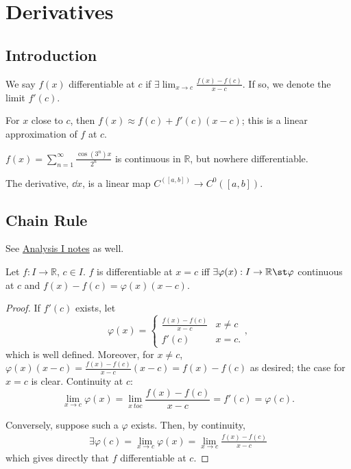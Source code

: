 \section{Derivatives}
\subsection{Introduction}

\begin{definition}[Differentiable]
    We say $f(x)$ differentiable at $c$ if $\exists \lim_{x \to c} \frac{f(x) - f(c)}{x-c}$. If so, we denote the limit $f'(c)$.
\end{definition}

\begin{remark}
    For $x$ close to $c$, then $f(x) \approx f(c) + f'(c)(x-c)$; this is a linear approximation of $f$ at $c$.
\end{remark}

\begin{example}[Weierstrass]
    $f(x) = \sum_{n=1}^\infty \frac{\cos(3^n)x}{2^n}$ is continuous in $\mathbb{R}$, but nowhere differentiable.
\end{example}
\begin{definition}
    The derivative, $\dd{x}$, is a linear map $C^([a, b]) \to C^0([a, b])$.
\end{definition}

\subsection{Chain Rule}
\begin{remark}
    See \href{https://notes.louismeunier.net/Analysis%201/analysis.pdf#page=96}{Analysis I notes} as well.
\end{remark}
\begin{theorem}\label{thm:Caratheodory}
    Let $f: I \to \mathbb{R}$, $c \in I$. $f$ is differentiable at $x = c$ iff $\exists \varphi(x) : I \to \mathbb{R} \st \varphi$ continuous at $c$ and $f(x) - f(c) = \varphi(x)(x - c)$.
\end{theorem}

\begin{proof}
    If $f'(c)$ exists, let \[
    \varphi(x) = \begin{cases}
        \frac{f(x) - f(c)}{x-c} & x \neq c\\
        f'(c) & x = c.
    \end{cases},    
    \]
    which is well defined. Moreover, for $x \neq c$, $\varphi(x)(x - c) = \frac{f(x)-f(c)}{x-c}(x-c) = f(x)-f(c)$ as desired; the case for $x = c$ is clear. Continuity at $c$:
    \[
    \lim_{x \to c} \varphi(x) = \lim_{x \ to c} \frac{f(x) - f(c)}{x - c} = f'(c) = \varphi(c).    
    \]

    Conversely, suppose such a $\varphi$ exists. Then, by continuity, \begin{align*}
        \exists \varphi(c) = \lim_{x \to c} \varphi(x) = \lim_{x \to c}\frac{f(x)-f(c)}{x - c}
    \end{align*}
    which gives directly that $f$ differentiable at $c$.
\end{proof}

